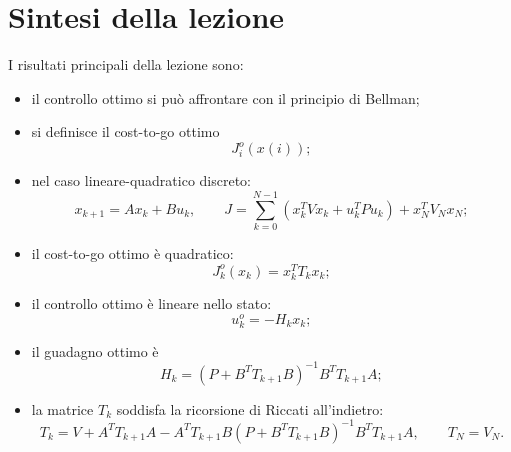 \section{Sintesi della lezione}

I risultati principali della lezione sono:

\begin{itemize}
    \item il controllo ottimo si può affrontare con il principio di Bellman;
    \item si definisce il cost-to-go ottimo
    \[
    J_i^o(x(i));
    \]
    \item nel caso lineare-quadratico discreto:
    \[
    x_{k+1}=Ax_k+Bu_k,
    \qquad
    J=\sum_{k=0}^{N-1}(x_k^TVx_k+u_k^TPu_k)+x_N^TV_Nx_N;
    \]
    \item il cost-to-go ottimo è quadratico:
    \[
    J_k^o(x_k)=x_k^TT_kx_k;
    \]
    \item il controllo ottimo è lineare nello stato:
    \[
    u_k^o=-H_kx_k;
    \]
    \item il guadagno ottimo è
    \[
    H_k=(P+B^TT_{k+1}B)^{-1}B^TT_{k+1}A;
    \]
    \item la matrice \(T_k\) soddisfa la ricorsione di Riccati all'indietro:
    \[
    T_k
    =
    V
    +
    A^TT_{k+1}A
    -
    A^TT_{k+1}B
    (P+B^TT_{k+1}B)^{-1}
    B^TT_{k+1}A,
    \qquad
    T_N=V_N.
    \]
\end{itemize}